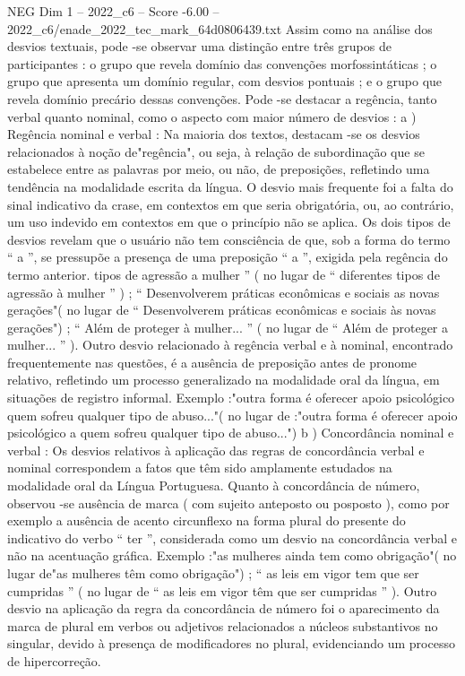 \begin{textsample}{NEG Dim 1 – 2022\_c6 – Score -6.00 – 2022\_c6/enade\_2022\_tec\_mark\_64d0806439.txt}
Assim como na análise dos desvios textuais, pode -se observar uma distinção entre três grupos de participantes : o grupo que revela domínio das convenções morfossintáticas ; o grupo que apresenta um domínio regular, com desvios pontuais ; e o grupo que revela domínio precário dessas convenções.
Pode -se destacar a regência, tanto verbal quanto nominal, como o aspecto com maior número de desvios : a ) Regência nominal e verbal : Na maioria dos textos, destacam -se os desvios relacionados à noção de"regência", ou seja, à relação de subordinação que se estabelece entre as palavras por meio, ou não, de preposições, refletindo uma tendência na modalidade escrita da língua.
O desvio mais frequente foi a falta do sinal indicativo da crase, em contextos em que seria obrigatória, ou, ao contrário, um uso indevido em contextos em que o princípio não se aplica.
Os dois tipos de desvios revelam que o usuário não tem consciência de que, sob a forma do termo “ a ”, se pressupõe a presença de uma preposição “ a ”, exigida pela regência do termo anterior. tipos de agressão a mulher ” ( no lugar de “ diferentes tipos de agressão à mulher ” ) ; “ Desenvolverem práticas econômicas e sociais as novas gerações"( no lugar de “ Desenvolverem práticas econômicas e sociais às novas gerações") ; “ Além de proteger à mulher... ” ( no lugar de “ Além de proteger a mulher... ” ).
Outro desvio relacionado à regência verbal e à nominal, encontrado frequentemente nas questões, é a ausência de preposição antes de pronome relativo, refletindo um processo generalizado na modalidade oral da língua, em situações de registro informal.
Exemplo :"outra forma é oferecer apoio psicológico quem sofreu qualquer tipo de abuso..."( no lugar de :"outra forma é oferecer apoio psicológico a quem sofreu qualquer tipo de abuso...") b ) Concordância nominal e verbal : Os desvios relativos à aplicação das regras de concordância verbal e nominal correspondem a fatos que têm sido amplamente estudados na modalidade oral da Língua Portuguesa.
Quanto à concordância de número, observou -se ausência de marca ( com sujeito anteposto ou posposto ), como por exemplo a ausência de acento circunflexo na forma plural do presente do indicativo do verbo “ ter ”, considerada como um desvio na concordância verbal e não na acentuação gráfica.
Exemplo :"as mulheres ainda tem como obrigação"( no lugar de"as mulheres têm como obrigação") ; “ as leis em vigor tem que ser cumpridas ” ( no lugar de “ as leis em vigor têm que ser cumpridas ” ).
Outro desvio na aplicação da regra da concordância de número foi o aparecimento da marca de plural em verbos ou adjetivos relacionados a núcleos substantivos no singular, devido à presença de modificadores no plural, evidenciando um processo de hipercorreção.

\end{textsample}
